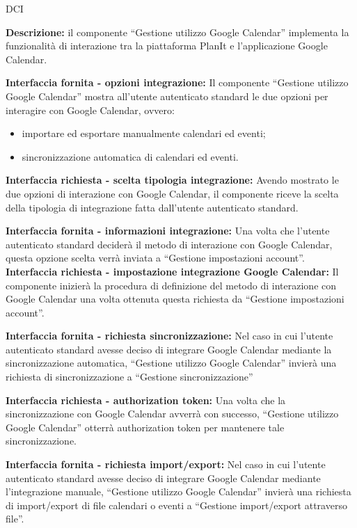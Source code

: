 \begin{listaPersonale}{DCI}

    \textbf{Descrizione:} il componente “Gestione utilizzo Google Calendar” implementa la funzionalità di interazione tra la piattaforma PlanIt e l'applicazione Google Calendar.

    \textbf{Interfaccia fornita - opzioni integrazione:} Il componente “Gestione utilizzo Google Calendar” mostra all'utente autenticato standard le due opzioni per interagire con Google Calendar, ovvero:
    \begin{itemize}
        \item importare ed esportare manualmente calendari ed eventi;
        \item sincronizzazione automatica di calendari ed eventi.
    \end{itemize}

    \textbf{Interfaccia richiesta - scelta tipologia integrazione:} Avendo mostrato le due opzioni di interazione con Google Calendar, il componente riceve la scelta della tipologia di integrazione fatta dall'utente autenticato standard.

    \textbf{Interfaccia fornita - informazioni integrazione:} Una volta che l'utente autenticato standard deciderà il metodo di interazione con Google Calendar, questa opzione scelta verrà inviata a “Gestione impostazioni account”.
    \textbf{Interfaccia richiesta - impostazione integrazione Google
        Calendar:} Il componente inizierà la procedura di definizione del metodo di interazione con Google Calendar una volta ottenuta questa richiesta da “Gestione impostazioni account”.

    \textbf{Interfaccia fornita - richiesta sincronizzazione:} Nel caso in cui l'utente autenticato standard avesse deciso di integrare Google Calendar mediante la sincronizzazione automatica, “Gestione utilizzo Google Calendar” invierà una richiesta di sincronizzazione a “Gestione sincronizzazione”

    \textbf{Interfaccia richiesta - authorization token:} Una volta che la sincronizzazione con Google Calendar avverrà con successo, “Gestione utilizzo Google Calendar” otterrà authorization token per mantenere tale sincronizzazione.

    \textbf{Interfaccia fornita - richiesta import/export:}  Nel caso in cui l'utente autenticato standard avesse deciso di integrare Google Calendar mediante l'integrazione manuale, “Gestione utilizzo Google Calendar” invierà una richiesta di import/export di file calendari o eventi a “Gestione import/export attraverso file”.



\end{listaPersonale}
